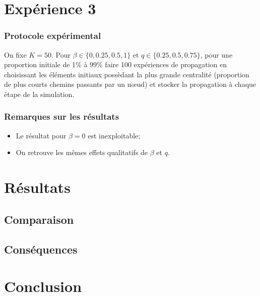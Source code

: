 \documentclass{beamer}
\begin{document}
\section{Expérience 3}
\begin{frame}
  \frametitle{Protocole expérimental}
  On fixe $K=50$.
  Pour $\beta \in \{0,0.25,0.5,1\}$ et $q\in \{0.25, 0.5, 0.75\}$, pour une proportion initiale de 1\% à 99\% faire 100 expériences de propagation en choisissant les éléments initiaux possèdant la plus grande centralité (proportion de plus courts chemins passants par un nœud) et stocker la propagation à chaque étape de la simulation.
\end{frame}
\begin{frame}
  \frametitle{Remarques sur les résultats}
  \begin{itemize}
    \item<1-> Le résultat pour $\beta=0$ est inexploitable;
    \item<2-> On retrouve les mêmes effets qualitatifs de $\beta$ et $q$.
  \end{itemize}
\end{frame}

\section{Résultats}
\subsection{Comparaison}
\subsection{Conséquences}

\section{Conclusion}
\end{document}
